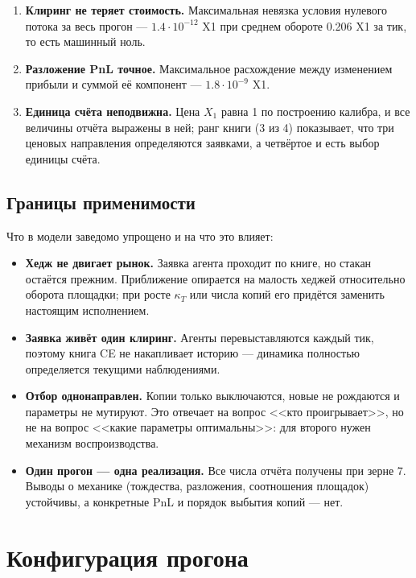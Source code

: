\documentclass[11pt,a4paper]{article}
\newcommand{\term}[1]{\textbf{#1}}
\begin{document}
\begin{enumerate}
\item \term{Клиринг не теряет стоимость.} Максимальная невязка условия
нулевого потока за весь прогон --- \(1.4\cdot 10^{-12}\) X1 при среднем обороте
0.206 X1 за тик, то есть машинный ноль.
\item \term{Разложение PnL точное.} Максимальное расхождение между
изменением прибыли и суммой её компонент --- \(1.8\cdot 10^{-9}\) X1.
\item \term{Единица счёта неподвижна.} Цена \(X_1\) равна 1 по построению
калибра, и все величины отчёта выражены в ней; ранг книги (3 из 4)
показывает, что три ценовых направления определяются заявками, а четвёртое
и есть выбор единицы счёта.
\end{enumerate}

\subsection{Границы применимости}

Что в модели заведомо упрощено и на что это влияет:

\begin{itemize}
\item \term{Хедж не двигает рынок.} Заявка агента проходит по книге, но
стакан остаётся прежним. Приближение опирается на малость хеджей
относительно оборота площадки; при росте \(\kappa_T\) или числа копий его
придётся заменить настоящим исполнением.
\item \term{Заявка живёт один клиринг.} Агенты перевыставляются каждый тик,
поэтому книга CE не накапливает историю --- динамика полностью
определяется текущими наблюдениями.
\item \term{Отбор однонаправлен.} Копии только выключаются, новые не
рождаются и параметры не мутируют. Это отвечает на вопрос <<кто
проигрывает>>, но не на вопрос <<какие параметры оптимальны>>: для второго
нужен механизм воспроизводства.
\item \term{Один прогон --- одна реализация.} Все числа отчёта получены при
зерне 7. Выводы о механике (тождества, разложения, соотношения
площадок) устойчивы, а конкретные PnL и порядок выбытия копий --- нет.
\end{itemize}


\clearpage
\appendix
\section{Конфигурация прогона}
\end{document}
